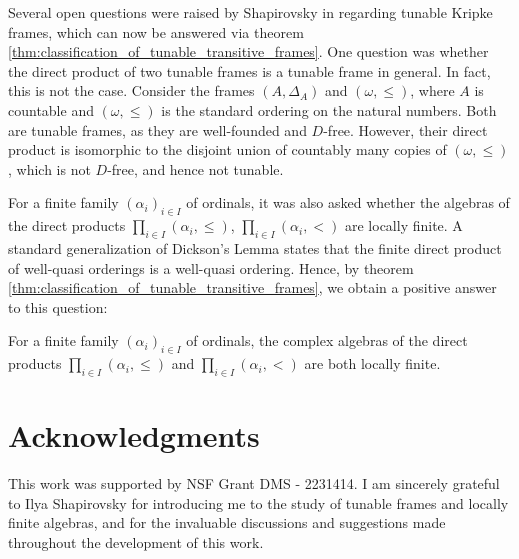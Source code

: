 \documentclass[submission]{eptcs}
\begin{document}
Several open questions were raised by Shapirovsky in \cite{Shapirovsky_2019} regarding tunable Kripke frames, which can now be answered via theorem \ref{thm:classification_of_tunable_transitive_frames}.
One question was whether the direct product of two tunable frames is a tunable frame in general.
In fact, this is not the case.
Consider the frames $(A, \Delta_A)$ and $(\omega, \leq)$, where $A$ is countable and $(\omega, \leq)$ is the standard ordering on the natural numbers.
Both are tunable frames, as they are well-founded and $D$-free.
However, their direct product is isomorphic to the disjoint union of countably many copies of $(\omega,\leq)$, which is not $D$-free, and hence not tunable.
\par
For a finite family $(\alpha_i)_{i\in I}$ of ordinals, it was also asked whether the algebras of the direct products $\prod_{i \in I}(\alpha_i,\leq)$, $\prod_{i \in I}(\alpha_i,<)$ are locally finite.
A standard generalization of Dickson's Lemma \cite{Dickson_1913} states that the finite direct product of well-quasi orderings is a well-quasi ordering. 
Hence, by theorem \ref{thm:classification_of_tunable_transitive_frames}, we obtain a positive answer to this question:

\begin{proposition}
    For a finite family $(\alpha_i)_{i\in I}$ of ordinals, the complex algebras of the direct products $\prod_{i \in I}(\alpha_i,\leq)$ and $\prod_{i \in I}(\alpha_i,<)$ are both locally finite.
\end{proposition}

\section{Acknowledgments}

This work was supported by NSF Grant DMS - 2231414.
I am sincerely grateful to Ilya Shapirovsky for introducing me to the study of tunable frames and locally finite algebras, and for the invaluable discussions and suggestions made throughout the development of this work.

\nocite{*}


\end{document}
